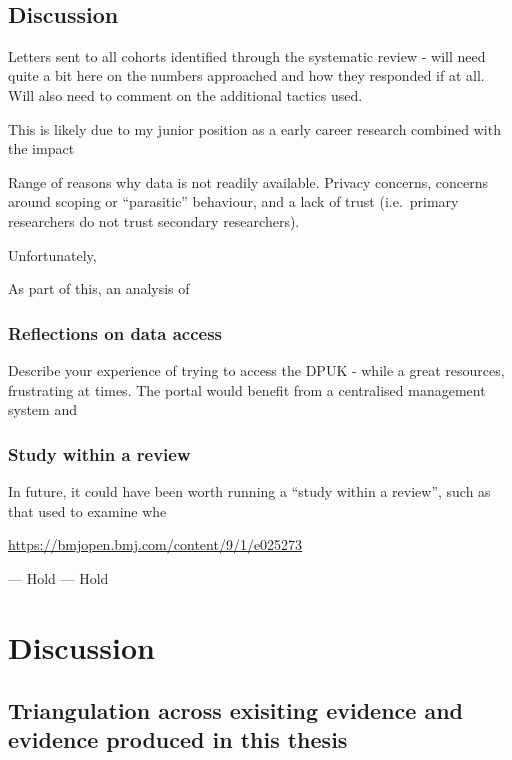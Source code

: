 \documentclass[a4paper, twoside]{templates/ociamthesis}
\begin{document}
~

\hypertarget{discussion-3}{%
\section{Discussion}\label{discussion-3}}

Letters sent to all cohorts identified through the systematic review - will need quite a bit here on the numbers approached and how they responded if at all. Will also need to comment on the additional tactics used.

This is likely due to my junior position as a early career research combined with the impact

Range of reasons why data is not readily available. Privacy concerns, concerns around scoping or ``parasitic'' behaviour, and a lack of trust (i.e.~primary researchers do not trust secondary researchers).

Unfortunately,

As part of this, an analysis of

\hypertarget{reflections-on-data-access}{%
\subsection{Reflections on data access}\label{reflections-on-data-access}}

Describe your experience of trying to access the DPUK - while a great resources, frustrating at times. The portal would benefit from a centralised management system and

\hypertarget{study-within-a-review}{%
\subsection{Study within a review}\label{study-within-a-review}}

In future, it could have been worth running a ``study within a review'', such as that used to examine whe

\url{https://bmjopen.bmj.com/content/9/1/e025273}

--- Hold --- Hold

\hypertarget{discussion-heading}{%
\chapter{Discussion}\label{discussion-heading}}

\minitoc 

\hypertarget{triangulation-across-exisiting-evidence-and-evidence-produced-in-this-thesis}{%
\section{Triangulation across exisiting evidence and evidence produced in this thesis}\label{triangulation-across-exisiting-evidence-and-evidence-produced-in-this-thesis}}
\end{document}
